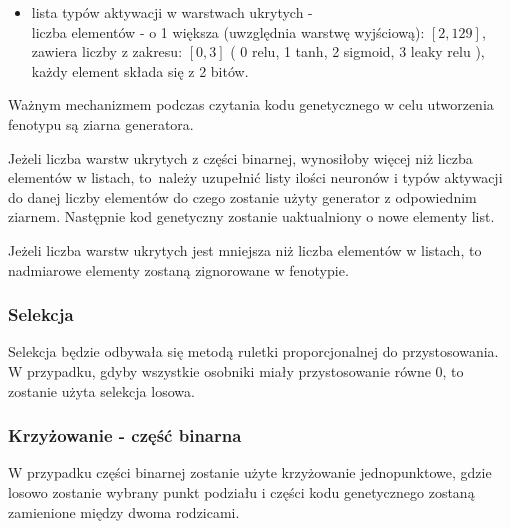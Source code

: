 \begin{itemize}
\begin{itemize}
        \hspace*{1em}każdy element składa się z 10 bitów.
      \item lista typów aktywacji w warstwach ukrytych -\\
        \hspace*{1em}liczba elementów - o 1 większa
          (uwzględnia warstwę wyjściową):
          $\left[2, 129\right]$,\\
        \hspace*{1em}zawiera liczby z zakresu:
          $\left[0, 3\right]$
          (%
            0 \textrightarrow relu,
            1 \textrightarrow tanh,
            2 \textrightarrow sigmoid,
            3 \textrightarrow leaky relu%
          ),\\
        \hspace*{1em}każdy element składa się z 2 bitów.
    \end{itemize}
\end{itemize}
Ważnym mechanizmem podczas czytania kodu genetycznego
w celu utworzenia fenotypu są ziarna generatora.

\noindent
Jeżeli liczba warstw ukrytych z części binarnej,
wynosiłoby więcej niż liczba elementów w listach,
to~należy uzupełnić listy ilości neuronów
i typów aktywacji do danej liczby elementów do czego zostanie
użyty generator z odpowiednim ziarnem.
Następnie kod genetyczny zostanie uaktualniony o nowe elementy list.

\noindent
Jeżeli liczba warstw ukrytych jest mniejsza niż liczba elementów w listach,
to nadmiarowe elementy zostaną zignorowane w fenotypie.

\subsubsection{Selekcja}
Selekcja będzie odbywała się metodą ruletki proporcjonalnej do przystosowania.
W przypadku, gdyby wszystkie osobniki miały przystosowanie równe 0,
to zostanie użyta selekcja losowa.

\subsubsection{Krzyżowanie - część binarna}
W przypadku części binarnej zostanie użyte krzyżowanie jednopunktowe,
gdzie losowo zostanie wybrany punkt podziału i
części kodu genetycznego zostaną zamienione między dwoma rodzicami.

